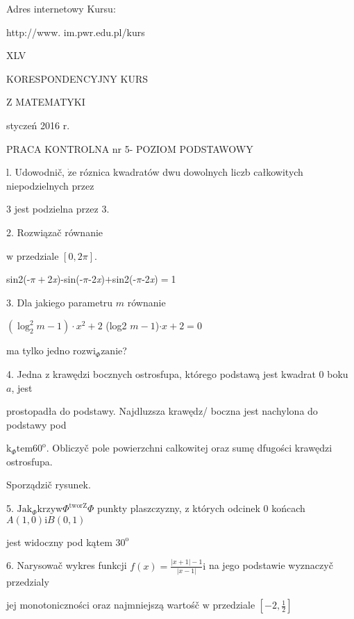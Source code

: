 \documentclass[a4paper,12pt]{article}
\begin{document}
Adres internetowy Kursu:

http://www. im.pwr.edu.pl/kurs







XLV

KORESPONDENCYJNY KURS

Z MATEMATYKI

styczeń 2016 r.

PRACA KONTROLNA nr 5- POZIOM PODSTAWOWY

l. Udowodnič, $\dot{\mathrm{z}}\mathrm{e}$ róznica kwadratów dwu dowolnych liczb całkowitych niepodzielnych przez

3 jest podzielna przez 3.

2. Rozwiązač równanie

$\mathrm{w}$ przedziale $[0,2\pi].$

sin2(-$\pi+$2{\it x})-sin(-$\pi$-2{\it x})$+$sin2(-$\pi$-2{\it x})$=$1

3. Dla jakiego parametru $m$ równanie

$(\log_{2}^{2}m-1)\cdot x^{2}+2$ (log2 $m-1$)$\cdot x+2=0$

ma tylko jedno $\mathrm{r}\mathrm{o}\mathrm{z}\mathrm{w}\mathrm{i}_{\Phi}\mathrm{z}\mathrm{a}\mathrm{n}\mathrm{i}\mathrm{e}$?

4. Jedna $\mathrm{z}$ krawędzi bocznych ostrosfupa, którego podstawą jest kwadrat $0$ boku $a$, jest

prostopadła do podstawy. Najdluzsza krawędz/ boczna jest nachylona do podstawy pod

$\mathrm{k}_{\Phi}\mathrm{t}\mathrm{e}\mathrm{m}60^{\mathrm{o}}$. Obliczyč pole powierzchni calkowitej oraz sumę dfugości krawędzi ostrosfupa.

Sporządzič rysunek.

5. $\mathrm{J}\mathrm{a}\mathrm{k}_{\Phi}\mathrm{k}\mathrm{r}\mathrm{z}\mathrm{y}\mathrm{w}\Phi^{\mathrm{t}\mathrm{w}\mathrm{o}\mathrm{r}\mathrm{Z}}\Phi$ punkty plaszczyzny, $\mathrm{z}$ których odcinek $0$ końcach $A(1,0)\mathrm{i}B(0,1)$

jest widoczny pod kątem $30^{\mathrm{o}}$

6. Narysowač wykres funkcji $f(x)=\displaystyle \frac{|x+1|-1}{|x-1|}\mathrm{i}$ na jego podstawie wyznaczyč przedzialy

jej monotoniczności oraz najmniejszą wartośč $\mathrm{w}$ przedziale $[-2,\displaystyle \frac{1}{2}]$
\end{document}

